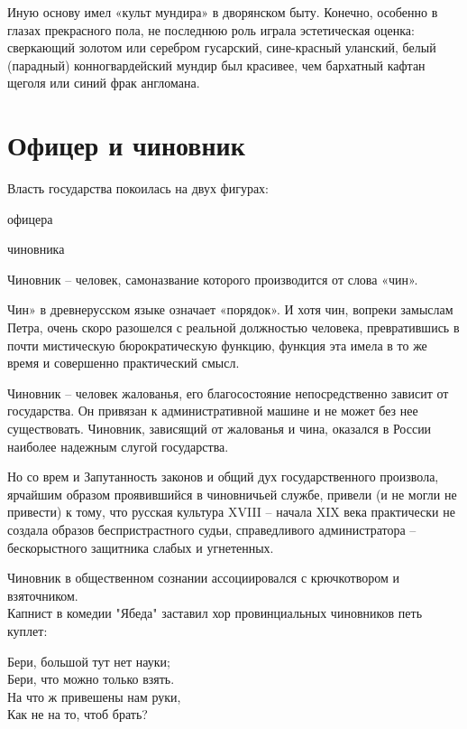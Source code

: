 \documentclass[12pt,a4paper]{article}
\begin{document}
Иную основу имел «культ мундира» в дворянском быту.
Конечно, особенно в глазах прекрасного пола, не
последнюю роль играла эстетическая оценка: 
сверкающий золотом или серебром гусарский, сине-красный
уланский, белый (парадный) конногвардейский мундир был
красивее, чем бархатный кафтан щеголя или синий фрак
англомана.
\section{Офицер и чиновник}
Власть государства покоилась на двух фигурах:

офицера

чиновника

Чиновник – человек, самоназвание которого производится от слова «чин». 

Чин» в древнерусском языке означает «порядок». И хотя чин,
вопреки замыслам Петра, очень скоро разошелся
с реальной должностью человека, превратившись в почти
мистическую бюрократическую функцию, функция эта имела
в то же время и совершенно практический смысл.

Чиновник – человек жалованья, его благосостояние
непосредственно зависит от государства. Он привязан
к административной машине и не может без нее
существовать. Чиновник, зависящий от жалованья и чина,
оказался в России наиболее надежным слугой государства.

Но со врем и Запутанность законов и общий дух государственного
произвола, ярчайшим образом проявившийся
в чиновничьей службе, привели (и не могли не привести)
к тому, что русская культура XVIII  – начала XIX века
практически не создала образов беспристрастного судьи,
справедливого администратора – бескорыстного защитника
слабых и угнетенных. 

Чиновник в общественном сознании
ассоциировался с крючкотвором и взяточником.\\
Капнист в комедии  "Ябеда" заставил хор провинциальных чиновников петь
куплет:

Бери, большой тут нет науки;\\
Бери, что можно только взять.\\
На что ж привешены нам руки,\\
Как не на то, чтоб брать?\\
\end{document}
